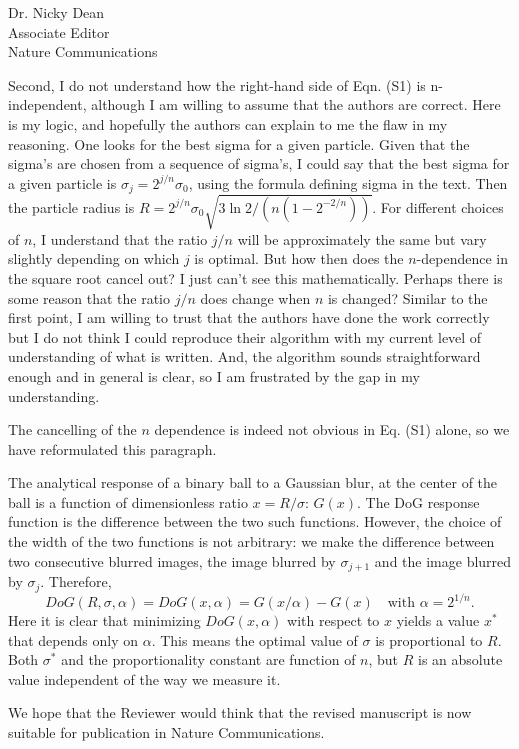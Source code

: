 \documentclass[a4paper, rebuttal, parskip=true, firsthead=false, fromemail=true, foldmarks=false]{scrlttr2}
\begin{document}
\begin{letter}{Dr. Nicky Dean\\
Associate Editor\\
Nature Communications}
\begin{quotationi}
Second, I do not understand how the right-hand side of Eqn. (S1) is n-independent, although I am willing to assume that the authors are correct. Here is my logic, and hopefully the authors can explain to me the flaw in my reasoning. One looks for the best sigma for a given particle. Given that the sigma's are chosen from a sequence of sigma's, I could say that the best sigma for a given particle is $\sigma_j = 2^{j/n} \sigma_0$, using the formula defining sigma in the text. Then the particle radius is $R = 2^{j/n} \sigma_0 \sqrt{3 \ln 2 / (n (1-2^{-2/n}))}$. For different choices of $n$, I understand that the ratio $j/n$ will be approximately the same but vary slightly depending on which $j$ is optimal. But how then does the $n$-dependence in the square root cancel out? I just can't see this mathematically. Perhaps there is some reason that the ratio $j/n$ does change when $n$ is changed? Similar to the first point, I am willing to trust that the authors have done the work correctly but I do not think I could reproduce their algorithm with my current level of understanding of what is written. And, the algorithm sounds straightforward enough and in general is clear, so I am frustrated by the gap in my understanding.
\end{quotationi}

The cancelling of the $n$ dependence is indeed not obvious in Eq. (S1) alone, so we have reformulated this paragraph.


The analytical response of a binary ball to a Gaussian blur, at the center of the ball is a function of dimensionless ratio $x=R/\sigma$: $G(x)$. The DoG response function is the difference between the two such functions. However, the choice of the width of the two functions is not arbitrary: we make the difference between two consecutive blurred images, the image blurred by $\sigma_{j+1}$ and the image blurred by $\sigma_j$. Therefore, 
\[
DoG(R,\sigma, \alpha) = DoG(x, \alpha) = G(x/\alpha) - G(x) \quad\text{with }\alpha=2^{1/n}.
\]
Here it is clear that minimizing $DoG(x, \alpha)$ with respect to $x$ yields a value $x^*$ that depends only on $\alpha$. This means the optimal value of $\sigma$ is proportional to $R$.  Both $\sigma^*$ and the proportionality constant are function of $n$, but $R$ is an absolute value independent of the way we measure it.

We hope that the Reviewer would think that the revised manuscript is now suitable for publication in Nature Communications. 


\end{letter} 
\end{document}
